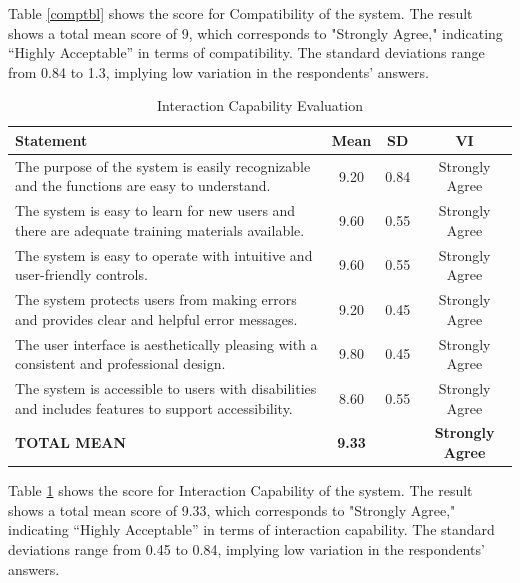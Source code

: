 	Table \ref{comptbl} shows the score for Compatibility of the system. The result shows a total mean score of 9, which corresponds to "Strongly Agree," indicating “Highly Acceptable” in terms of compatibility. The standard deviations range from 0.84 to 1.3, implying low variation in the respondents’ answers.
	
	
	\begin{table}[h!]
		\centering
		\caption{Interaction Capability Evaluation}
		\label{intcap}
		\renewcommand{\arraystretch}{1.2}
		\begin{tabularx}{\linewidth}{|X|c|c|c|}
			\hline
			\textbf{Statement} & \textbf{Mean} & \textbf{SD} & \textbf{VI} \\ \hline
			The purpose of the system is easily recognizable and the functions are easy to understand.
			& 9.20 & 0.84 & Strongly Agree \\ \hline
			The system is easy to learn for new users and there are adequate training materials available.
			& 9.60 & 0.55 & Strongly Agree \\ \hline
			The system is easy to operate with intuitive and user-friendly controls.
			& 9.60 & 0.55 & Strongly Agree \\ \hline
			The system protects users from making errors and provides clear and helpful error messages.
			& 9.20 & 0.45 & Strongly Agree \\ \hline
			The user interface is aesthetically pleasing with a consistent and professional design.
			& 9.80 & 0.45 & Strongly Agree \\ \hline
			The system is accessible to users with disabilities and includes features to support accessibility.
			& 8.60 & 0.55 & Strongly Agree \\ \hline
			\textbf{TOTAL MEAN} & \textbf{9.33} & & \textbf{Strongly Agree} \\ \hline
		\end{tabularx}
	\end{table}
	
	Table \ref{intcap} shows the score for Interaction Capability of the system. The result shows a total mean score of 9.33, which corresponds to "Strongly Agree," indicating “Highly Acceptable” in terms of interaction capability. The standard deviations range from 0.45 to 0.84, implying low variation in the respondents’ answers.
	
